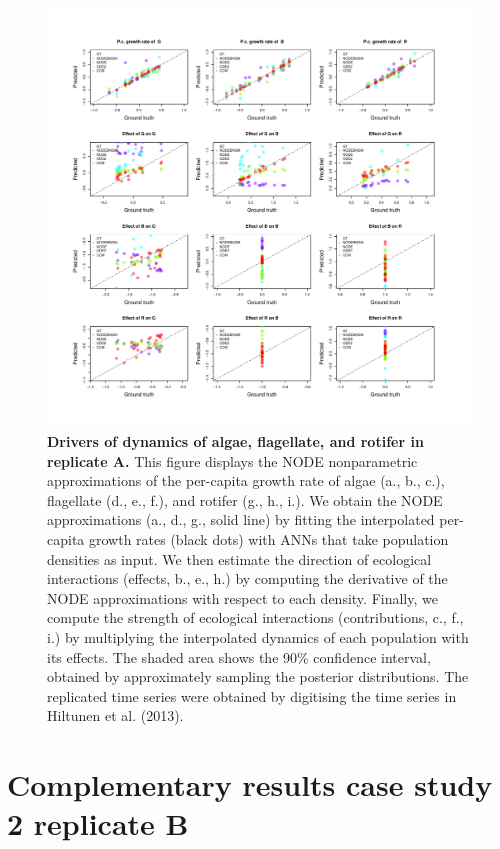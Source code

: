 \documentclass[11pt, oneside]{article}
\begin{document}
\newpage
\begin{figure}[H]
\includegraphics[width=1\linewidth,page=8]{figures/figures_supplementary.pdf}
\caption{
    \textbf{Drivers of dynamics of algae, flagellate, and rotifer in replicate A.}
    This figure displays the NODE nonparametric approximations of the per-capita growth rate of algae (a., b., c.), flagellate (d., e., f.), and rotifer (g., h., i.).
    We obtain the NODE approximations (a., d., g., solid line) by fitting the interpolated per-capita growth rates (black dots) with ANNs that take population densities as input.
    We then estimate the direction of ecological interactions (effects, b., e., h.) by computing the derivative of the NODE approximations with respect to each density.
    Finally, we compute the strength of ecological interactions (contributions, c., f., i.) by multiplying the interpolated dynamics of each population with its effects.
    The shaded area shows the 90\% confidence interval, obtained by approximately sampling the posterior distributions. 
    The replicated time series were obtained by digitising the time series in Hiltunen et al. (2013).
}
\end{figure}
\newpage

\newpage
\section{Complementary results case study 2 replicate B}
\end{document}
